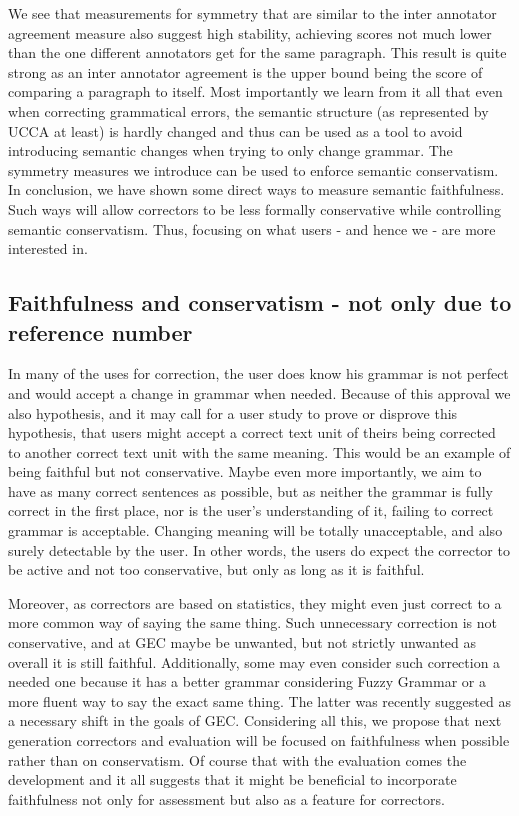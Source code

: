 \documentclass[letter,11pt]{article}
\begin{document}
	We see that measurements for symmetry that are similar to the inter
	annotator agreement measure also suggest high stability, achieving
	scores not much lower than the one different annotators get for the
	same paragraph. This result is quite strong as an inter annotator
	agreement is the upper bound being the score of comparing a paragraph to itself. 
	Most importantly we learn from it all that even when correcting grammatical errors, the semantic structure (as represented by UCCA at least) is hardly changed and thus can be used as a tool to avoid introducing semantic changes when trying to only change grammar. 
	The symmetry measures we introduce can be used to enforce semantic conservatism.
	In conclusion, we have shown some direct ways to measure
	semantic faithfulness. Such ways will allow correctors to be less formally conservative while controlling semantic conservatism. Thus, focusing on what users - and hence we - are more interested in.

\subsection{Faithfulness and conservatism - not only due to reference number}
	In many of the uses for correction,
		the user does know his grammar is not perfect and would accept
		a change in grammar when needed. Because of this approval we also
		hypothesis, and it may call for a user study to prove or disprove
		this hypothesis, that users might accept a correct text unit of theirs
		being corrected to another correct text unit with the same meaning.
		This would be an example of being faithful but not conservative.
		Maybe even more importantly, we aim to have as many correct sentences
		as possible, but as neither the grammar is fully correct in the first place,
		nor is the user's understanding of it, failing to correct grammar
		is acceptable. Changing meaning will be totally unacceptable, and
		also surely detectable by the user. In other words, the users do expect
		the corrector to be active and not too conservative, but
		only as long as it is faithful. 
		
		Moreover, as correctors are based on statistics, they might even
		just correct to a more common way of saying the same thing. Such unnecessary
		correction is not conservative, and at GEC maybe be unwanted, but not strictly unwanted as overall
		it is still faithful. Additionally, some may even
		consider such correction a needed one because it has a better grammar considering
		Fuzzy Grammar\cite{lakoff1973fuzzy,madnani2011they} or a more fluent
		way to say the exact same thing. The latter was recently suggested as a necessary
		shift in the goals of GEC\cite{sakaguchi2016reassessing}.
		Considering all this, we propose that next generation correctors and evaluation will be focused on faithfulness
		when possible rather than on conservatism. Of course that with the evaluation comes the development and it all suggests that it might be beneficial to incorporate faithfulness not only for assessment but also as a feature for correctors. 
\end{document}
